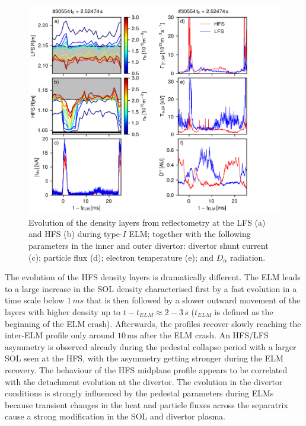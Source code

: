 \documentclass[12pt]{iopart}
\begin{document}
\begin{figure}[!bt]
\centering
\includegraphics{fig119.png}
\caption{Evolution of the density layers from reflectometry at the LFS (a) and HFS (b) during type-$I$ ELM; together with the following parameters in the inner and outer divertor: divertor shunt current (c);  particle flux (d); electron temperature (e); and $D_\alpha $ radiation.}
\label{fig:attached_elm_cycle}
\end{figure}

The evolution of the HFS density layers is dramatically different. The ELM leads to a large increase in the SOL density characterised first by a fast evolution in a time scale below $1\,ms$ that is then followed by a slower outward movement of the layers with higher density up to $t-t_{ELM} \approx 2-3\,s$ ($t_{ELM}$ is defined as the beginning of the ELM crash). Afterwards, the profiles recover slowly reaching the inter-ELM profile only around $\mathrm{10\,ms}$ after the ELM crash. An HFS/LFS asymmetry is observed already during the pedestal collapse period with a larger SOL seen at the HFS, with the asymmetry getting stronger during the ELM recovery. The behaviour of the HFS midplane profile appears to be correlated with the detachment evolution at the divertor. The evolution in the divertor conditions is strongly influenced by the pedestal parameters during ELMs because transient changes in the heat and particle fluxes across the separatrix cause a strong modification in the SOL and divertor plasma.
\end{document}
